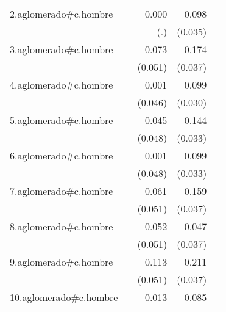 {\begin{longtable}{l*{4}{D{.}{.}{-1}}}
\addlinespace
2.aglomerado#c.hombre&                     &       0.000         &       0.098\sym{**} &                     \\
            &                     &         (.)         &     (0.035)         &                     \\
\addlinespace
3.aglomerado#c.hombre&                     &       0.073         &       0.174\sym{***}&                     \\
            &                     &     (0.051)         &     (0.037)         &                     \\
\addlinespace
4.aglomerado#c.hombre&                     &       0.001         &       0.099\sym{**} &                     \\
            &                     &     (0.046)         &     (0.030)         &                     \\
\addlinespace
5.aglomerado#c.hombre&                     &       0.045         &       0.144\sym{***}&                     \\
            &                     &     (0.048)         &     (0.033)         &                     \\
\addlinespace
6.aglomerado#c.hombre&                     &       0.001         &       0.099\sym{**} &                     \\
            &                     &     (0.048)         &     (0.033)         &                     \\
\addlinespace
7.aglomerado#c.hombre&                     &       0.061         &       0.159\sym{***}&                     \\
            &                     &     (0.051)         &     (0.037)         &                     \\
\addlinespace
8.aglomerado#c.hombre&                     &      -0.052         &       0.047         &                     \\
            &                     &     (0.051)         &     (0.037)         &                     \\
\addlinespace
9.aglomerado#c.hombre&                     &       0.113\sym{*}  &       0.211\sym{***}&                     \\
            &                     &     (0.051)         &     (0.037)         &                     \\
\addlinespace
10.aglomerado#c.hombre&                     &      -0.013         &       0.085\sym{**} &                     \\

\end{longtable}}
